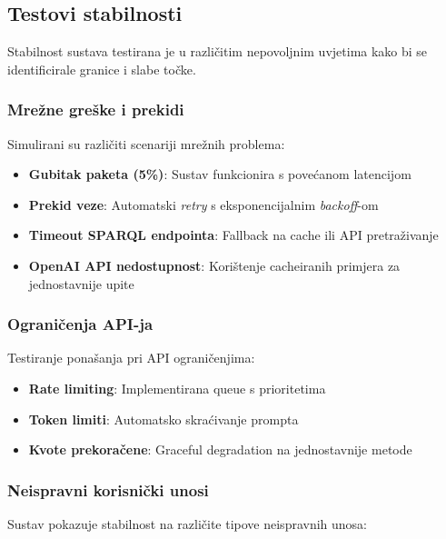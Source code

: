 \subsection{Testovi stabilnosti}

Stabilnost sustava testirana je u različitim nepovoljnim uvjetima kako bi se identificirale granice i slabe točke.

\subsubsection{Mrežne greške i prekidi}

Simulirani su različiti scenariji mrežnih problema:

\begin{itemize}
    \item \textbf{Gubitak paketa (5\%)}: Sustav funkcionira s povećanom latencijom
    \item \textbf{Prekid veze}: Automatski \textit{retry} s eksponencijalnim \textit{backoff}-om
    \item \textbf{Timeout SPARQL endpointa}: Fallback na cache ili API pretraživanje
    \item \textbf{OpenAI API nedostupnost}: Korištenje cacheiranih primjera za jednostavnije upite
\end{itemize}

\subsubsection{Ograničenja API-ja}

Testiranje ponašanja pri API ograničenjima:

\begin{itemize}
    \item \textbf{Rate limiting}: Implementirana queue s prioritetima
    \item \textbf{Token limiti}: Automatsko skraćivanje prompta
    \item \textbf{Kvote prekoračene}: Graceful degradation na jednostavnije metode
\end{itemize}

\subsubsection{Neispravni korisnički unosi}

Sustav pokazuje stabilnost na različite tipove neispravnih unosa:

